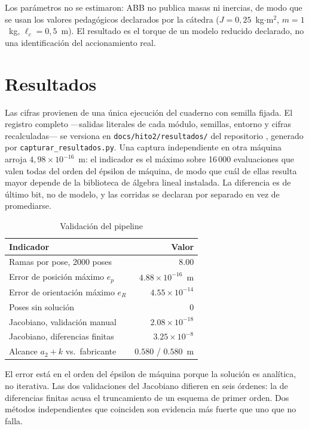 \documentclass[conference]{IEEEtran}
\begin{document}
Los parámetros no se estimaron: ABB no publica masas ni inercias, de
modo que se usan los valores pedagógicos declarados por la cátedra
\cite{b6} ($J=0{,}25$~kg$\cdot$m$^2$, $m=1$~kg, $\ell_c=0{,}5$~m). El
resultado es el torque de un modelo reducido declarado, no una
identificación del accionamiento real.

\section{Resultados}
\label{sec:result}

Las cifras provienen de una única ejecución del cuaderno con semilla
fijada. El registro completo ---salidas literales de cada módulo,
semillas, entorno y cifras recalculadas--- se versiona en
\texttt{docs/hito2/resultados/} del repositorio \cite{b7}, generado por
\texttt{capturar\_resultados.py}. Una captura independiente en otra máquina arroja
$4{,}98\times10^{-16}$~m: el indicador es el máximo sobre 16\,000
evaluaciones que valen todas del orden del épsilon de máquina, de modo
que cuál de ellas resulta mayor depende de la biblioteca de álgebra
lineal instalada. La diferencia es de último bit, no de modelo, y las
corridas se declaran por separado en vez de promediarse.

\begin{table}[htbp]
\caption{Validación del pipeline}
\label{tab:val}
\centering
\footnotesize
\begin{tabular}{@{}lr@{}}
\toprule
\textbf{Indicador} & \textbf{Valor} \\
\midrule
Ramas por pose, 2000 poses          & $8.00$ \\
Error de posición máximo $e_p$      & $4.88\times10^{-16}$~m \\
Error de orientación máximo $e_R$   & $4.55\times10^{-14}$ \\
Poses sin solución                  & $0$ \\
Jacobiano, validación manual        & $2.08\times10^{-18}$ \\
Jacobiano, diferencias finitas      & $3.25\times10^{-8}$ \\
Alcance $a_2+k$ vs.\ fabricante     & $0.580$ / $0.580$~m \\
\bottomrule
\end{tabular}
\end{table}

El error está en el orden del épsilon de máquina porque la solución es
analítica, no iterativa. Las dos validaciones del Jacobiano difieren en
seis órdenes: la de diferencias finitas acusa el truncamiento de un
esquema de primer orden. Dos métodos independientes que coinciden son
evidencia más fuerte que uno que no falla.
\end{document}
